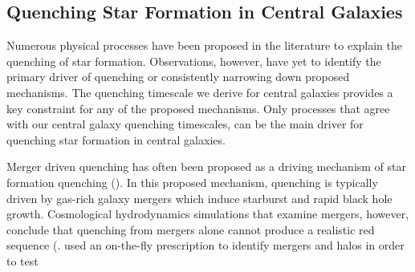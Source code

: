 \subsection{Quenching Star Formation in Central Galaxies}  
Numerous physical processes have been proposed in the literature to explain
the quenching of star formation. Observations, however, have yet to identify 
the primary driver of quenching or consistently narrowing down proposed
mechanisms. The quenching timescale we derive for central galaxies provides 
a key constraint for any of the proposed mechanisms. Only processes that agree 
with our central galaxy quenching timescales, can be the main driver for quenching 
star formation in central galaxies. 

Merger driven quenching has often been proposed as a driving mechanism 
of star formation quenching (\citealt{Springel:2005aa, Hopkins:2006ab, 
Hopkins:2008ab, Hopkins:2008aa}). In this proposed mechanism, quenching
is typically driven by gas-rich galaxy mergers which induce starburst and rapid 
black hole growth. 
Cosmological hydrodynamics simulations that examine mergers, however, 
conclude that quenching from mergers alone cannot 
produce a realistic red sequence (\citealt{Gabor:2010aa, Gabor:2011aa}.
\cite{Gabor:2011aa} used an on-the-fly 
prescription to identify mergers and halos in order to test

